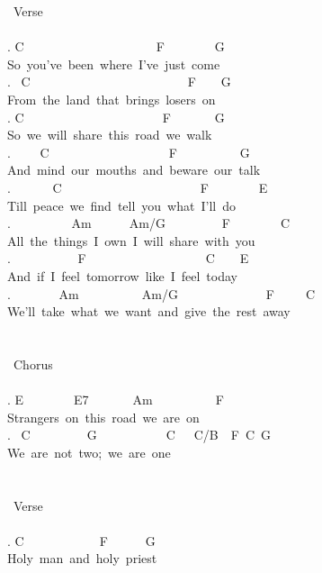 {\lbrack\ Verse\rbrack\\
\\
. C\ \ \ \ \ \ \ \ \ \ \ \ \ \ \ \ \ \ \ \ \ F\ \ \ \ \ \ \ \ G\\
So\ you've\ been\ where\ I've\ just\ come\\
. \ C\ \ \ \ \ \ \ \ \ \ \ \ \ \ \ \ \ \ \ \ \ \ \ \ \ F\ \ \ \ G\\
From\ the\ land\ that\ brings\ losers\ on\\
. C\ \ \ \ \ \ \ \ \ \ \ \ \ \ \ \ \ \ \ \ \ \ F\ \ \ \ \ \ \ G\\
So\ we\ will\ share\ this\ road\ we\ walk\\
. \ \ \ \ C\ \ \ \ \ \ \ \ \ \ \ \ \ \ \ \ \ \ \ F\ \ \ \ \ \ \ \ \ \ G\\
And\ mind\ our\ mouths\ and\ beware\ our\ talk\\
. \ \ \ \ \ \ C\ \ \ \ \ \ \ \ \ \ \ \ \ \ \ \ \ \ \ \ \ \ F\ \ \ \ \ \ \ \ E\\
Till\ peace\ we\ find\ tell\ you\ what\ I'll\ do\\
. \ \ \ \ \ \ \ \ \ Am\ \ \ \ \ \ Am/G\ \ \ \ \ \ \ \ \ F\ \ \ \ \ \ \ \ C\\
All\ the\ things\ I\ own\ I\ will\ share\ with\ you\\
. \ \ \ \ \ \ \ \ \ \ F\ \ \ \ \ \ \ \ \ \ \ \ \ \ \ \ \ \ \ C\ \ \ \ E\\
And\ if\ I\ feel\ tomorrow\ like\ I\ feel\ today\\
. \ \ \ \ \ \ \ Am\ \ \ \ \ \ \ \ \ \ Am/G\ \ \ \ \ \ \ \ \ \ \ \ \ \ F\ \ \ \ \ C\\
We'll\ take\ what\ we\ want\ and\ give\ the\ rest\ away\ \\
\\
\\
\lbrack\ Chorus\rbrack\\
\\
. E\ \ \ \ \ \ \ \ E7\ \ \ \ \ \ \ Am\ \ \ \ \ \ \ \ \ \ F\\
Strangers\ on\ this\ road\ we\ are\ on\\
. \ C\ \ \ \ \ \ \ \ \ G\ \ \ \ \ \ \ \ \ \ \ C\ \ \ C/B\ \ F\ C\ G\\
We\ are\ not\ two;\ we\ are\ one\\
\\
\\
\lbrack\ Verse\rbrack\\
\\
. C\ \ \ \ \ \ \ \ \ \ \ \ F\ \ \ \ \ \ G\\
Holy\ man\ and\ holy\ priest\\
}

